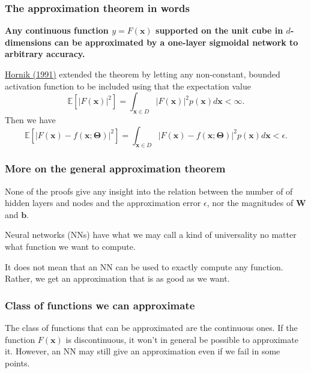 \documentclass{beamer}
\begin{document}
\begin{frame}
\frametitle{The approximation theorem in words}

\textbf{Any continuous function $y=F(\bm{x})$ supported on the unit cube in
$d$-dimensions can be approximated by a one-layer sigmoidal network to
arbitrary accuracy.}

\href{{https://www.sciencedirect.com/science/article/abs/pii/089360809190009T}}{Hornik (1991)} extended the theorem by letting any non-constant, bounded activation function to be included using that the expectation value
\[
\mathbb{E}[\vert F(\bm{x})\vert^2] =\int_{\bm{x}\in D} \vert F(\bm{x})\vert^2p(\bm{x})d\bm{x} < \infty.
\]
Then we have
\[
\mathbb{E}[\vert F(\bm{x})-f(\bm{x};\bm{\Theta})\vert^2] =\int_{\bm{x}\in D} \vert F(\bm{x})-f(\bm{x};\bm{\Theta})\vert^2p(\bm{x})d\bm{x} < \epsilon.
\]
\end{frame}

\begin{frame}
\frametitle{More on the general approximation theorem}

None of the proofs give any insight into the relation between the
number of of hidden layers and nodes and the approximation error
$\epsilon$, nor the magnitudes of $\bm{W}$ and $\bm{b}$.

Neural networks (NNs) have what we may call a kind of universality no matter what function we want to compute.

\begin{block}{}
It does not mean that an NN can be used to exactly compute any function. Rather, we get an approximation that is as good as we want. 
\end{block}
\end{frame}

\begin{frame}
\frametitle{Class of functions we can approximate}

\begin{block}{}
The class of functions that can be approximated are the continuous ones.
If the function $F(\bm{x})$ is discontinuous, it won't in general be possible to approximate it. However, an NN may still give an approximation even if we fail in some points.
\end{block}
\end{frame}
\end{document}
